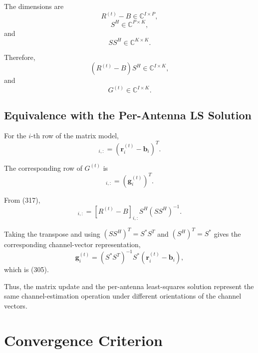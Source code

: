 \documentclass[12pt,a4paper]{article}
\begin{document}
The dimensions are
\begin{equation}
R^{(t)}-B\in\mathbb{C}^{I\times P},
\tag{318}
\end{equation}
\begin{equation}
S^H\in\mathbb{C}^{P\times K},
\tag{319}
\end{equation}
and
\begin{equation}
SS^H\in\mathbb{C}^{K\times K}.
\tag{320}
\end{equation}

Therefore,
\begin{equation}
(R^{(t)}-B)S^H
\in
\mathbb{C}^{I\times K},
\tag{321}
\end{equation}
and
\begin{equation}
\boxed{
G^{(t)}
\in
\mathbb{C}^{I\times K}
}.
\tag{322}
\end{equation}

\subsection{Equivalence with the Per-Antenna LS Solution}

For the $i$-th row of the matrix model,
\begin{equation}
[R^{(t)}-B]_{i,:}
=
(\mathbf r_i^{(t)}-\mathbf b_i)^T.
\tag{323}
\end{equation}

The corresponding row of $G^{(t)}$ is
\begin{equation}
[G^{(t)}]_{i,:}
=
(\mathbf g_i^{(t)})^T.
\tag{324}
\end{equation}

From (317),
\begin{equation}
[G^{(t)}]_{i,:}
=
[R^{(t)}-B]_{i,:}
S^H(SS^H)^{-1}.
\tag{325}
\end{equation}

Taking the transpose and using $(SS^H)^T=S^*S^T$ and
$(S^H)^T=S^*$ gives the corresponding channel-vector representation,
\begin{equation}
\mathbf g_i^{(t)}
=
(S^*S^T)^{-1}S^*
(\mathbf r_i^{(t)}-\mathbf b_i),
\tag{326}
\end{equation}
which is (305).

Thus, the matrix update and the per-antenna least-squares solution
represent the same channel-estimation operation under different
orientations of the channel vectors.

\section{Convergence Criterion}
\end{document}
